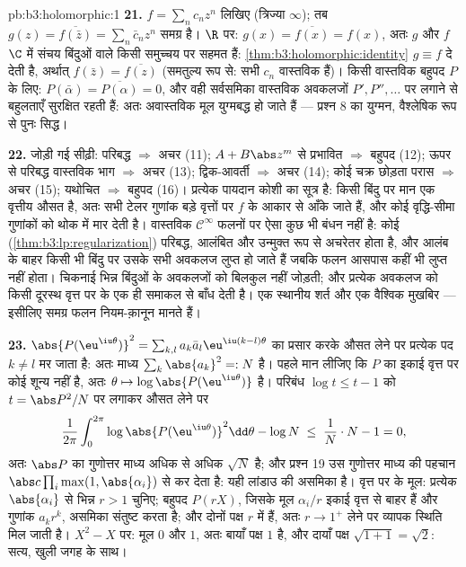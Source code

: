 \begin{solution}{pb:b3:holomorphic:1}
\textbf{21.} $f = \sum_nc_nz^n$ लिखिए (त्रिज्या $\infty$); तब $g(z) = \overline{f(\bar z)} = \sum_n\bar c_nz^n$ समग्र है। $\R$
पर: $g(x) = \overline{f(x)} = f(x)$, अतः $g$ और $f$  $\C$ में संचय बिंदुओं वाले किसी
समुच्चय पर सहमत हैं: \cref{thm:b3:holomorphic:identity} $g \equiv f$ दे देती है, अर्थात् $f(\bar z) = \overline{f(z)}$ (समतुल्य
रूप से: सभी $c_n$ वास्तविक हैं)। किसी वास्तविक बहुपद $P$ के लिए:
$P(\bar\alpha) = \overline{P(\alpha)} = 0$, और वही सर्वसमिका वास्तविक अवकलजों $P', P'', \dots$ पर लगाने से बहुलताएँ
सुरक्षित रहती हैं: अतः अवास्तविक मूल युग्मबद्ध हो जाते हैं ---
प्रश्न 8 का युग्मन, वैश्लेषिक रूप से पुनः सिद्ध।

\textbf{22.} जोड़ी गई सीढ़ी: परिबद्ध $\Rightarrow$ अचर (11); $A + B\abs z^m$ से प्रभावित
$\Rightarrow$ बहुपद (12); ऊपर से परिबद्ध वास्तविक भाग $\Rightarrow$ अचर (13);
द्विक-आवर्ती $\Rightarrow$ अचर (14); कोई चक्र छोड़ता परास $\Rightarrow$ अचर (15);
यथोचित $\Rightarrow$ बहुपद (16)। प्रत्येक पायदान कोशी का सूत्र है: किसी
बिंदु पर मान एक वृत्तीय औसत है, अतः सभी टेलर गुणांक बड़े वृत्तों पर
$f$ के आकार से आँके जाते हैं, और कोई वृद्धि-सीमा गुणांकों को थोक
में मार देती है। वास्तविक $\mathcal
C^\infty$ फलनों पर ऐसा कुछ भी बंधन नहीं है:
कोई  (\cref{thm:b3:lp:regularization}) परिबद्ध,  आलंबित और उन्मुक्त रूप से अचरेतर
होता है, और आलंब के बाहर किसी भी बिंदु पर उसके सभी अवकलज लुप्त हो
जाते हैं जबकि फलन आसपास कहीं भी लुप्त नहीं होता। चिकनाई भिन्न बिंदुओं
के अवकलजों को बिलकुल नहीं जोड़ती; और  प्रत्येक अवकलज
को किसी दूरस्थ वृत्त पर के एक ही समाकल से बाँध देती है। एक स्थानीय
शर्त और एक वैश्विक मुखबिर --- इसीलिए समग्र फलन नियम-क़ानून मानते
हैं।

\textbf{23.} $\abs{P(\eu^{\iu\theta})}^2 = \sum_{k,l}a_k\bar a_l
\eu^{\iu(k-l)\theta}$ का प्रसार करके औसत लेने पर प्रत्येक पद $k \neq
l$ मर
जाता है: अतः माध्य $\sum_k\abs{a_k}^2 =: N$ है। पहले मान लीजिए कि $P$ का इकाई वृत्त
पर कोई शून्य नहीं है, अतः $\theta \mapsto
\log\abs{P(\eu^{\iu\theta})}$  है। परिबंध $\log
t \leq t - 1$ को $t = \abs P^2/N$ पर
लगाकर औसत लेने पर
\[
\frac1{2\pi}\int_0^{2\pi}\log\abs{P(\eu^{\iu\theta})}^2
\dd\theta - \log N
\;\leq\; \frac1N\cdot N - 1 = 0,
\]
अतः $\abs P$ का गुणोत्तर माध्य अधिक से अधिक $\sqrt N$ है; और प्रश्न 19 उस
गुणोत्तर माध्य की पहचान $\abs c\prod_i\max(1, \abs{\alpha_i})$ से कर देता है: यही लांडाउ की असमिका
है। वृत्त पर के मूल: प्रत्येक $\abs{\alpha_i}$ से भिन्न $r > 1$ चुनिए; बहुपद
$P(rX)$, जिसके मूल $\alpha_i/r$ इकाई वृत्त से बाहर हैं और गुणांक $a_kr^k$, असमिका
संतुष्ट करता है; और दोनों पक्ष $r$ में  हैं, अतः $r \to 1^+$ लेने पर
व्यापक स्थिति मिल जाती है। $X^2 -
X$ पर: मूल $0$ और $1$, अतः बायाँ
पक्ष $1$ है, और दायाँ पक्ष $\sqrt{1 + 1} = \sqrt2$: सत्य, खुली जगह के साथ।


\end{solution}
